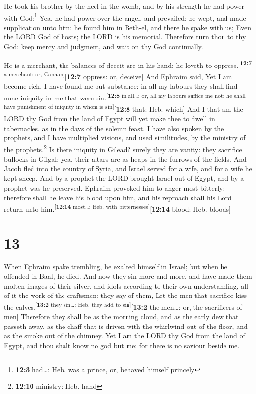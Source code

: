  He took his brother by the heel in the womb, and by his
strength he had power with God:\footnote{\textbf{12:3} had\ldots: Heb.
  was a prince, or, behaved himself princely}  Yea, he had
power over the angel, and prevailed: he wept, and made supplication unto
him: he found him in Beth-el, and there he spake with us; 
Even the LORD God of hosts; the LORD is his memorial. 
Therefore turn thou to thy God: keep mercy and judgment, and wait on thy
God continually.

 He is a merchant, the balances of deceit are in his hand:
he loveth to oppress.\textsuperscript{{[}\textbf{12:7} a merchant: or,
Canaan{]}}{[}\textbf{12:7} oppress: or, deceive{]}  And
Ephraim said, Yet I am become rich, I have found me out substance: in
all my labours they shall find none iniquity in me that were
sin.\textsuperscript{{[}\textbf{12:8} in all\ldots: or, all my labours
suffice me not: he shall have punishment of iniquity in whom is
sin{]}}{[}\textbf{12:8} that: Heb. which{]}  And I that am
the LORD thy God from the land of Egypt will yet make thee to dwell in
tabernacles, as in the days of the solemn feast.  I have
also spoken by the prophets, and I have multiplied visions, and used
similitudes, by the ministry of the prophets.\footnote{\textbf{12:10}
  ministry: Heb. hand}  Is there iniquity in Gilead?
surely they are vanity: they sacrifice bullocks in Gilgal; yea, their
altars are as heaps in the furrows of the fields.  And
Jacob fled into the country of Syria, and Israel served for a wife, and
for a wife he kept sheep.  And by a prophet the LORD
brought Israel out of Egypt, and by a prophet was he preserved.
 Ephraim provoked him to anger most bitterly: therefore
shall he leave his blood upon him, and his reproach shall his Lord
return unto him.\textsuperscript{{[}\textbf{12:14} most\ldots: Heb. with
bitternesses{]}}{[}\textbf{12:14} blood: Heb. bloods{]}

\hypertarget{section-12}{%
\section{13}\label{section-12}}

 When Ephraim spake trembling, he exalted himself in
Israel; but when he offended in Baal, he died.  And now
they sin more and more, and have made them molten images of their
silver, and idols according to their own understanding, all of it the
work of the craftsmen: they say of them, Let the men that sacrifice kiss
the calves.\textsuperscript{{[}\textbf{13:2} they sin\ldots: Heb. they
add to sin{]}}{[}\textbf{13:2} the men\ldots: or, the sacrificers of
men{]}  Therefore they shall be as the morning cloud, and
as the early dew that passeth away, as the chaff that is driven with the
whirlwind out of the floor, and as the smoke out of the chimney.
 Yet I am the LORD thy God from the land of Egypt, and
thou shalt know no god but me: for there is no saviour beside me.

